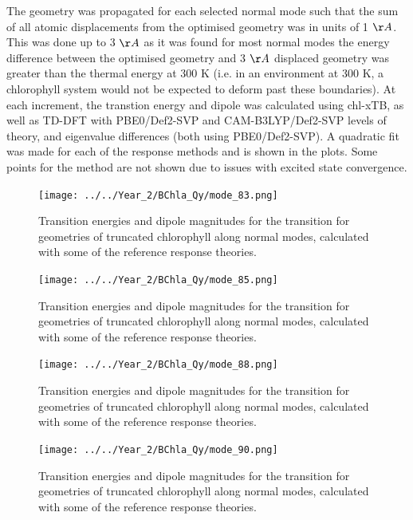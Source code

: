 The geometry was propagated for each selected normal mode such that the sum of
all atomic displacements from the optimised geometry was in units of 1 $\AA{}$.
This was done up to 3 $\AA{}$ as it was found for most normal modes the energy 
difference between the optimised geometry and 3 $\AA{}$ displaced geometry was greater
than the thermal energy at 300 K (i.e. in an environment at 300 K, a chlorophyll 
system would not be expected to deform past these boundaries). At each increment,
the \Qy transtion energy and dipole was calculated using chl-xTB, as well as TD-DFT
with PBE0/Def2-SVP and CAM-B3LYP/Def2-SVP levels of theory, \dscf and eigenvalue 
differences (both using PBE0/Def2-SVP). A quadratic fit was made for each of the
response methods and is shown in the plots. Some points for the \dscf method are
not shown due to issues with excited state convergence.

\begin{figure}
    \centering
    \texttt{[image: ../../Year\_2/BChla\_Qy/mode\_83.png]}
    \label{fig:mode_83}
    \caption{Transition energies and dipole magnitudes for the \Qy transition for
    geometries of truncated chlorophyll along normal modes, calculated with some 
    of the reference response theories.}
\end{figure}

\begin{figure}
    \centering
    \texttt{[image: ../../Year\_2/BChla\_Qy/mode\_85.png]}
    \label{fig:mode_85}
    \caption{Transition energies and dipole magnitudes for the \Qy transition for
    geometries of truncated chlorophyll along normal modes, calculated with some 
    of the reference response theories.}
\end{figure}

\begin{figure}
    \centering
    \texttt{[image: ../../Year\_2/BChla\_Qy/mode\_88.png]}
    \label{fig:mode_88}
    \caption{Transition energies and dipole magnitudes for the \Qy transition for
    geometries of truncated chlorophyll along normal modes, calculated with some 
    of the reference response theories.}
\end{figure}

\begin{figure}
    \centering
    \texttt{[image: ../../Year\_2/BChla\_Qy/mode\_90.png]}
    \label{fig:mode_90}
    \caption{Transition energies and dipole magnitudes for the \Qy transition for
    geometries of truncated chlorophyll along normal modes, calculated with some 
    of the reference response theories.}
\end{figure}

